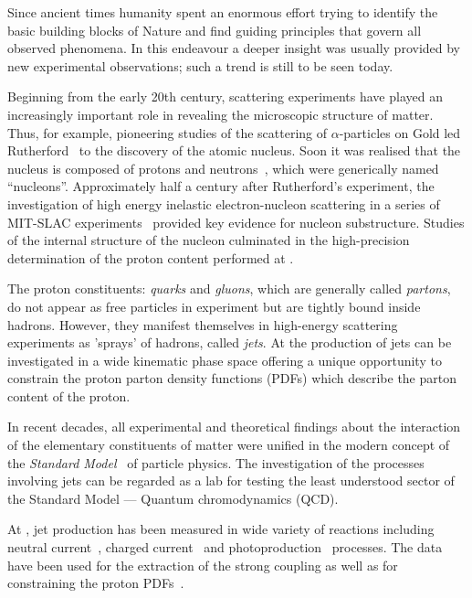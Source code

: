 Since ancient times humanity spent an enormous effort trying to identify the basic building blocks of Nature and find guiding principles that govern all observed phenomena. In this endeavour a deeper insight was usually provided by new experimental observations; such a trend is still to be seen today.

Beginning from the early 20th century, scattering experiments have played an increasingly important role in revealing the microscopic structure of matter. Thus, for example, pioneering studies of the scattering of $\alpha$-particles on Gold led Rutherford~\cite{pm:21:669} to the discovery of the atomic nucleus. Soon it was realised that the nucleus is composed of protons and neutrons~\cite{Chadwick:1932ma}, which were generically named ``nucleons''. Approximately half a century after Rutherford's experiment, the investigation of high energy inelastic electron-nucleon scattering in a series of MIT-SLAC experiments~\cite{Panofsky:1968pb, Bloom:1969kc, Briedenbach:1969, Taylor:1991ew, Kendall:1991np} provided key evidence for nucleon substructure. Studies of the internal structure of the nucleon culminated in the high-precision determination of the proton content performed at \hera.

The proton constituents: \emph{quarks} and \emph{gluons}, which are generally called \emph{partons}, do not appear as free particles in experiment but are tightly bound inside hadrons. However, they manifest themselves in high-energy scattering experiments as 'sprays' of hadrons, called \emph{jets}. At \hera the production of jets can be investigated in a wide kinematic phase space offering a unique opportunity to constrain the proton parton density functions (PDFs) which describe the parton content of the proton.

In recent decades, all experimental and theoretical findings about the interaction of the elementary constituents of matter were unified in the modern concept of the \emph{Standard Model}~\cite{PDG:2014} of particle physics. The investigation of the processes involving jets can be regarded as a lab for testing the least understood sector of the Standard Model --- Quantum chromodynamics (QCD).

At \hera, jet production has been measured in wide variety of reactions including neutral current~\cite{epj:c19:289,pl:b547:164,pl:b551:226,np:b765:1,pl:b649:12,epj:c65:363,epj:c67:1,pl:b507:70,epj:c23:13,pl:b515:17,epj:c44:183,pr:d85:052008}, charged current~\cite{epj:c31:149,pr:d78:032004} and photoproduction~\cite{pl:b560:7,epj:c29:497,epj:c11:35,epj:c23:615,pl:b531:9,epj:c25:13,pl:b639:21,pr:d76:072011,pl:b443:394,np:b792:1} processes. The data have been used for the extraction of the strong coupling as well as for constraining the proton PDFs~\cite{epj:c42:1}.

